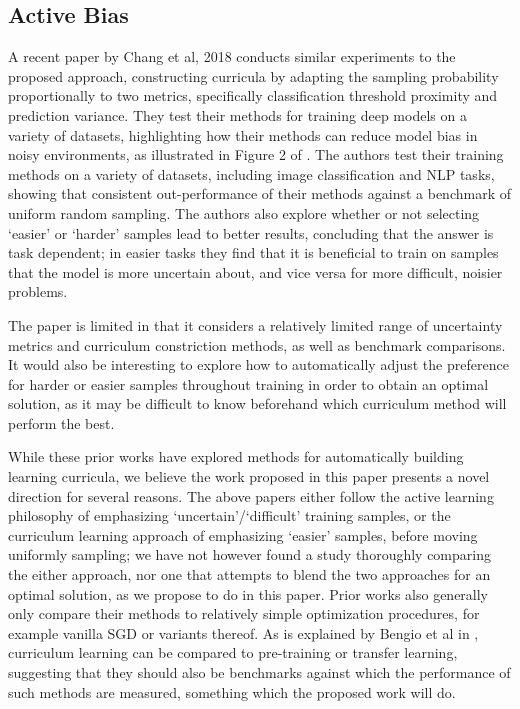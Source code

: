 \documentclass[a4paper,10pt]{article}
\begin{document}
\subsection*{Active Bias}
A recent paper by Chang et al, 2018 \cite{Chang 18} conducts similar experiments to the proposed approach, constructing curricula by adapting the sampling probability proportionally to two metrics, specifically classification threshold proximity and prediction variance. They test their methods for training deep models on a variety of datasets, highlighting how their methods can reduce model bias in noisy environments, as illustrated in Figure 2 of \cite{Chang 18}. The authors test their training methods on a variety of datasets, including image classification and NLP tasks, showing that consistent out-performance of their methods against a benchmark of uniform random sampling. The authors also explore whether or not selecting `easier' or `harder' samples lead to better results, concluding that the answer is task dependent; in easier tasks they find that it is beneficial to train on samples that the model is more uncertain about, and vice versa for more difficult, noisier problems. 

The paper is limited in that it considers a relatively limited range of uncertainty metrics and curriculum constriction methods, as well as benchmark comparisons. It would also be interesting to explore how to automatically adjust the preference for harder or easier samples throughout training in order to obtain an optimal solution, as it may be difficult to know beforehand which curriculum method will perform the best. 
\vspace{0.5cm}

While these prior works have explored methods for automatically building learning curricula, we believe the work proposed in this paper presents a novel direction for several reasons. The above papers either follow the active learning philosophy of emphasizing `uncertain'/`difficult' training samples, or the curriculum learning approach of emphasizing `easier' samples, before moving uniformly sampling; we have not however found a study thoroughly comparing the either approach, nor one that attempts to blend the two approaches for an optimal solution, as we propose to do in this paper. Prior works also generally only compare their methods to relatively simple optimization procedures, for example vanilla SGD or variants thereof. As is explained by Bengio et al in \cite{Bengio 09}, curriculum learning can be compared to pre-training or transfer learning, suggesting that they should also be benchmarks against which the performance of such methods are measured, something which the proposed work will do. 
\end{document}
